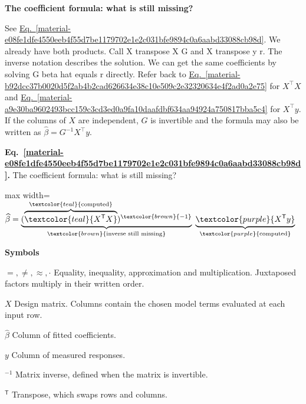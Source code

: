 \documentclass[11pt,a4paper]{article}
\begin{document}
\textbf{The coefficient formula: what is still missing?}


See \hyperref[material-e08fe1dfe4550eeb4f55d7be1179702e1e2c031bfe9894c0a6aabd33088cb98d]{Eq.~\ref*{material-e08fe1dfe4550eeb4f55d7be1179702e1e2c031bfe9894c0a6aabd33088cb98d}}. We already have both products. Call X transpose X G and X transpose y r. The inverse notation describes the solution. We can get the same coefficients by solving G beta hat equals r directly. Refer back to \hyperref[material-b92dcc37b0020d5f2ab4b2cad626634e38c10e509c2e32320634e4f2ad0a2e75]{Eq.~\ref*{material-b92dcc37b0020d5f2ab4b2cad626634e38c10e509c2e32320634e4f2ad0a2e75}} for \(X^\top X\) and \hyperref[material-a9e30ba9602493bcc159c3cd3ed0a9fa10daafdbf634aa94924a750817bba5c4]{Eq.~\ref*{material-a9e30ba9602493bcc159c3cd3ed0a9fa10daafdbf634aa94924a750817bba5c4}} for \(X^\top y\). If the columns of \(X\) are independent, \(G\) is invertible and the formula may also be written as \(\widehat\beta=G^{-1}X^\top y\).


\par\medskip
\noindent\begin{minipage}{\linewidth}
\label{material-e08fe1dfe4550eeb4f55d7be1179702e1e2c031bfe9894c0a6aabd33088cb98d}
\noindent\textbf{Eq.~\ref*{material-e08fe1dfe4550eeb4f55d7be1179702e1e2c031bfe9894c0a6aabd33088cb98d}.} The coefficient formula: what is still missing?\par\nopagebreak
\begin{center}\begin{adjustbox}{max width=\linewidth}$\displaystyle \widehat\beta=\underbrace{(\overbrace{\textcolor{teal}{X^{\mathsf T}X}}^{\textcolor{teal}{\text{computed}}})^{\textcolor{brown}{-1}}}_{\textcolor{brown}{\text{inverse still missing}}}\;\underbrace{\textcolor{purple}{X^{\mathsf T}y}}_{\textcolor{purple}{\text{computed}}}$\end{adjustbox}\end{center}

\par\noindent\textbf{Symbols}

\par\noindent\textbf{\(=,\ne,\approx,\cdot\)} Equality, inequality, approximation and multiplication. Juxtaposed factors multiply in their written order.

\par\noindent\textbf{\(X\)} Design matrix. Columns contain the chosen model terms evaluated at each input row.

\par\noindent\textbf{\(\widehat\beta\)} Column of fitted coefficients.

\par\noindent\textbf{\(y\)} Column of measured responses.

\par\noindent\textbf{\({}^{-1}\)} Matrix inverse, defined when the matrix is invertible.

\par\noindent\textbf{\({}^{\mathsf T}\)} Transpose, which swaps rows and columns.

\end{minipage}\par
\medskip
\end{document}
